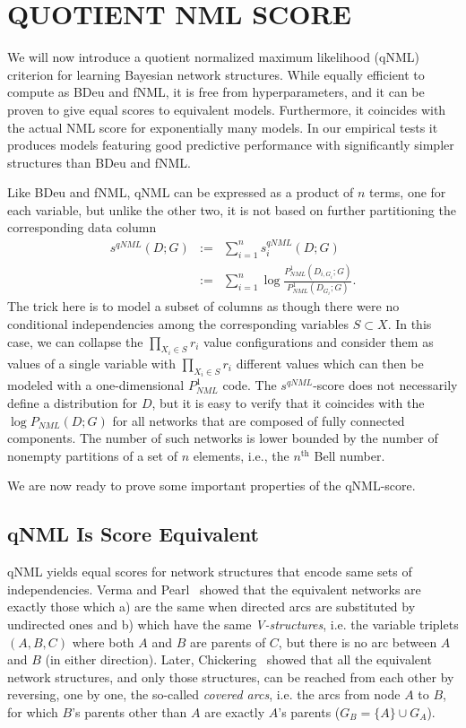 \section{QUOTIENT NML SCORE}

We will now introduce a quotient normalized maximum likelihood (qNML)
criterion for learning Bayesian network structures.  While equally
efficient to compute as BDeu and fNML, it is free from
hyperparameters, and it can be proven to give equal scores to
equivalent models. Furthermore, it coincides with the actual NML score
for exponentially many models. In our empirical tests it produces
models featuring good predictive performance with significantly
simpler structures than BDeu and fNML.

Like BDeu and fNML, qNML can be expressed as a product of $n$ terms,
one for each variable, but unlike the other two, it is not based on
further partitioning the corresponding data column
\begin{eqnarray}
\label{eqn:qnmldef}
s^{qNML}(D;G) & := & \sum_{i=1}^n s^{qNML}_i(D;G)\\
& := & \sum_{i=1}^n \log \frac{P^1_{NML}(D_{i,G_i};G)}
                             {P^1_{NML}(D_{G_i};G)}.\nonumber
\end{eqnarray}
The trick here is to model a subset of columns as though there were no
conditional independencies among the corresponding variables $S
\subset X$.  In this case, we can collapse the $\prod_{X_i\in S} r_i$
value configurations and consider them as values of a single variable
with $\prod_{X_i\in S} r_i$ different values which can then be modeled
with a one-dimensional $P^1_{NML}$ code.  The $s^{qNML}$-score does
not necessarily define a distribution for $D$, but it is easy to
verify that it coincides with the $\log P_{NML}(D;G)$ for all networks
that are composed of fully connected components.  The number of such
networks is lower bounded by the number of nonempty partitions of a
set of $n$ elements, i.e., the $n^\text{th}$ Bell number.

We are now ready to prove some important properties of the qNML-score.

\subsection {qNML Is Score Equivalent}

qNML yields equal scores for network structures that encode same sets
of independencies. Verma and Pearl~\cite{Verm90} showed that the
equivalent networks are exactly those which a) are the same when directed
arcs are substituted by undirected ones and b) which have the same
\textit{V-structures}, i.e. the variable triplets $(A,B,C)$ where both
$A$ and $B$ are parents of $C$, but there is no arc between $A$ and
$B$ (in either direction).  Later, Chickering~\cite{Chick95} showed
that all the equivalent network structures, and only those structures,
can be reached from each other by reversing, one by one, the so-called
\textit{covered arcs}, i.e. the arcs from node $A$ to $B$, for which
$B$'s parents other than $A$ are exactly  $A$'s parents
($G_B=\{A\}\cup G_A$).

